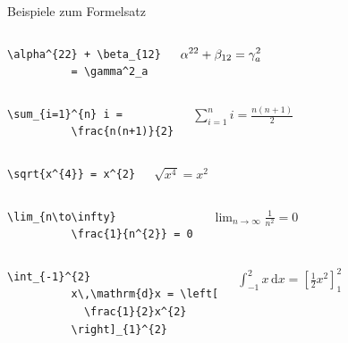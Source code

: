 \begin{Frame}[fragile]{Beispiele zum Formelsatz}

  \begin{columns}
    \column{5cm}
      \begin{lstlisting}[gobble=8]
        \alpha^{22} + \beta_{12}
          = \gamma^2_a
      \end{lstlisting}
    \column{4cm}
      $\displaystyle\displaystyle\alpha^{22} + \beta_{12} = \gamma^2_a$
  \end{columns}

  \pause

  \begin{columns}
    \column{5cm}
      \begin{lstlisting}[gobble=8]
        \sum_{i=1}^{n} i =
          \frac{n(n+1)}{2}
      \end{lstlisting}
    \column{4cm}
      $\displaystyle\sum_{i=1}^n i = \frac{n(n+1)}{2}$
  \end{columns}

  \pause

  \begin{columns}
    \column{5cm}
      \begin{lstlisting}[gobble=8]
        \sqrt{x^{4}} = x^{2}
      \end{lstlisting}
    \column{4cm}
      $\displaystyle\sqrt{x^4} = x^2$
  \end{columns}

  \pause

  \begin{columns}
    \column{5cm}
      \begin{lstlisting}[gobble=8]
        \lim_{n\to\infty}
          \frac{1}{n^{2}} = 0
      \end{lstlisting}
    \column{4cm}
      $\displaystyle\lim_{n\to\infty} \frac{1}{n^2} = 0$
  \end{columns}
  
  \pause

  \begin{columns}
    \column{5cm}
      \begin{lstlisting}[gobble=8]
        \int_{-1}^{2}
          x\,\mathrm{d}x = \left[
            \frac{1}{2}x^{2}
          \right]_{1}^{2}
      \end{lstlisting}
    \column{4cm}
      $\displaystyle\int_{-1}^{2} x\,\mathrm{d}x=\left[ \frac{1}{2}x^2 \right]_1^2$
  \end{columns}
\end{Frame}

